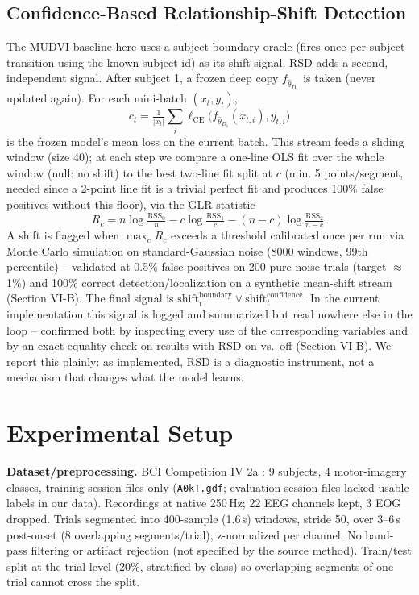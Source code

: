\documentclass[conference]{IEEEtran}
\begin{document}
\subsection{Confidence-Based Relationship-Shift Detection}
\label{sec:rsd}
The MUDVI baseline here uses a subject-boundary oracle (fires once per subject transition using the known subject id) as its shift signal. RSD adds a second, independent signal. After subject 1, a frozen deep copy $f_{\hat\theta_{D_1}}$ is taken (never updated again). For each mini-batch $(x_t,y_t)$,
\begin{equation}
c_t = \tfrac{1}{|x_t|}\textstyle\sum_i \ell_{\mathrm{CE}}\big(f_{\hat\theta_{D_1}}(x_{t,i}), y_{t,i}\big)
\label{eq:ct}
\end{equation}
is the frozen model's mean loss on the current batch. This stream feeds a sliding window (size 40); at each step we compare a one-line OLS fit over the whole window (null: no shift) to the best two-line fit split at $c$ (min. 5 points/segment, needed since a 2-point line fit is a trivial perfect fit and produces 100\% false positives without this floor), via the GLR statistic
\begin{equation}
R_c = n\log\tfrac{\mathrm{RSS}_0}{n} - c\log\tfrac{\mathrm{RSS}_1}{c} - (n{-}c)\log\tfrac{\mathrm{RSS}_2}{n{-}c}.
\label{eq:glr}
\end{equation}
A shift is flagged when $\max_c R_c$ exceeds a threshold calibrated once per run via Monte Carlo simulation on standard-Gaussian noise (8000 windows, 99th percentile) -- validated at 0.5\% false positives on 200 pure-noise trials (target $\approx$1\%) and 100\% correct detection/localization on a synthetic mean-shift stream (Section VI-B). The final signal is $\text{shift}_t^{\mathrm{boundary}} \lor \text{shift}_t^{\mathrm{confidence}}$. In the current implementation this signal is logged and summarized but read nowhere else in the loop -- confirmed both by inspecting every use of the corresponding variables and by an exact-equality check on results with RSD on vs.\ off (Section VI-B). We report this plainly: as implemented, RSD is a diagnostic instrument, not a mechanism that changes what the model learns.

\section{Experimental Setup}

\textbf{Dataset/preprocessing.} BCI Competition IV 2a \cite{brunner2008bci}: 9 subjects, 4 motor-imagery classes, training-session files only (\texttt{A0kT.gdf}; evaluation-session files lacked usable labels in our data). Recordings at native 250\,Hz; 22 EEG channels kept, 3 EOG dropped. Trials segmented into 400-sample (1.6\,s) windows, stride 50, over 3--6\,s post-onset (8 overlapping segments/trial), z-normalized per channel. No band-pass filtering or artifact rejection (not specified by the source method). Train/test split at the trial level (20\%, stratified by class) so overlapping segments of one trial cannot cross the split.
\end{document}
